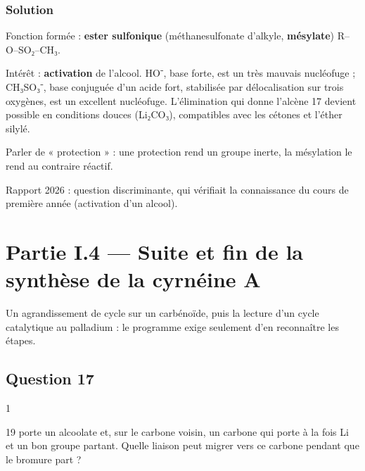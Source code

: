 \documentclass[11pt,a4paper]{article}
\begin{document}
\hypertarget{solution-15}{%
\subsubsection{Solution}\label{solution-15}}

Fonction formée : \textbf{ester sulfonique} (méthanesulfonate d'alkyle, \textbf{mésylate}) R--O--SO₂--CH₃.

Intérêt : \textbf{activation} de l'alcool. HO⁻, base forte, est un très mauvais nucléofuge ; CH₃SO₃⁻, base conjuguée d'un acide fort, stabilisée par délocalisation sur trois oxygènes, est un excellent nucléofuge. L'élimination qui donne l'alcène 17 devient possible en conditions douces (Li₂CO₃), compatibles avec les cétones et l'éther silylé.

\begin{piege}

Parler de « protection » : une protection rend un groupe inerte, la mésylation le rend au contraire réactif.

\end{piege}

\begin{jury}

Rapport 2026 : question discriminante, qui vérifiait la connaissance du cours de première année (activation d'un alcool).

\end{jury}

\hypertarget{partie-i.4-suite-et-fin-de-la-synthuxe8se-de-la-cyrnuxe9ine-a}{%
\section{Partie I.4 --- Suite et fin de la synthèse de la cyrnéine A}\label{partie-i.4-suite-et-fin-de-la-synthuxe8se-de-la-cyrnuxe9ine-a}}

Un agrandissement de cycle sur un carbénoïde, puis la lecture d'un cycle catalytique au palladium : le programme exige seulement d'en reconnaître les étapes.

\hypertarget{question-17}{%
\subsection{Question 17}\label{question-17}}

\begin{indication}{1}

19 porte un alcoolate et, sur le carbone voisin, un carbone qui porte à la fois Li et un bon groupe partant. Quelle liaison peut migrer vers ce carbone pendant que le bromure part ?

\end{indication}
\end{document}
